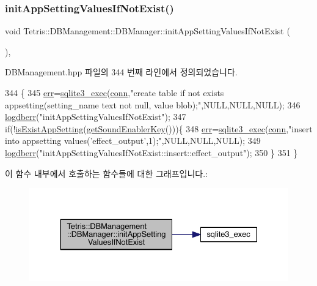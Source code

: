 \subsubsection{\texorpdfstring{init\+App\+Setting\+Values\+If\+Not\+Exist()}{initAppSettingValuesIfNotExist()}}
{\footnotesize\ttfamily void Tetris\+::\+D\+B\+Management\+::\+D\+B\+Manager\+::init\+App\+Setting\+Values\+If\+Not\+Exist (\begin{DoxyParamCaption}{ }\end{DoxyParamCaption})\hspace{0.3cm}{\ttfamily [inline]}, {\ttfamily [private]}}



D\+B\+Management.\+hpp 파일의 344 번째 라인에서 정의되었습니다.


\begin{DoxyCode}
344                                                  \{
345                 \hyperlink{class_tetris_1_1_d_b_management_1_1_d_b_manager_a9ea8d963f1a9b8117fa5e92b54eda114}{err}=\hyperlink{sqlite3_8h_a97487ec8150e0bcc8fa392ab8f0e24db}{sqlite3\_exec}(\hyperlink{class_tetris_1_1_d_b_management_1_1_d_b_manager_acc2c19420c2b1b1b2c1e724b3a8ec4b7}{conn},\textcolor{stringliteral}{"create table if not exists
       appsetting(setting\_name text not null, value blob);"},NULL,NULL,NULL);
346                 \hyperlink{class_tetris_1_1_d_b_management_1_1_d_b_manager_a6b723e555cef747b7402661eb960bd78}{logdberr}(\textcolor{stringliteral}{"initAppSettingValuesIfNotExist"});
347                 \textcolor{keywordflow}{if}(!\hyperlink{class_tetris_1_1_d_b_management_1_1_d_b_manager_aa80722572c33389c1c73f88de9f199b6}{isExistAppSetting}(\hyperlink{class_tetris_1_1_d_b_management_1_1_d_b_manager_ae8c98091466565c4c70971e6b7a42ce6}{getSoundEnablerKey}()))\{
348                     \hyperlink{class_tetris_1_1_d_b_management_1_1_d_b_manager_a9ea8d963f1a9b8117fa5e92b54eda114}{err}=\hyperlink{sqlite3_8h_a97487ec8150e0bcc8fa392ab8f0e24db}{sqlite3\_exec}(\hyperlink{class_tetris_1_1_d_b_management_1_1_d_b_manager_acc2c19420c2b1b1b2c1e724b3a8ec4b7}{conn},\textcolor{stringliteral}{"insert into appsetting
       values('effect\_output',1);"},NULL,NULL,NULL);
349                     \hyperlink{class_tetris_1_1_d_b_management_1_1_d_b_manager_a6b723e555cef747b7402661eb960bd78}{logdberr}(\textcolor{stringliteral}{"initAppSettingValuesIfNotExist::insert::effect\_output"});
350                 \}
351             \}
\end{DoxyCode}
이 함수 내부에서 호출하는 함수들에 대한 그래프입니다.\+:
\nopagebreak
\begin{figure}[H]
\begin{center}
\leavevmode
\includegraphics[width=330pt]{da/d79/class_tetris_1_1_d_b_management_1_1_d_b_manager_a08f9bdc18cc015a7746e47c37eba613c_cgraph}
\end{center}
\end{figure}
